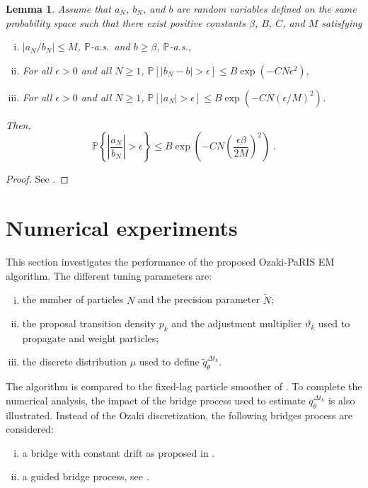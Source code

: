 \documentclass[12pt]{article}
\newcommand{\eqsp}{\;}
\newcommand{\1}{\mathrm{1}}
\newtheorem{lemma}{Lemma}
\begin{document}
\begin{lemma}\label{lem:hoeffding:ratio}
Assume that $a_N$, $b_N$, and $b$ are random variables defined on the same probability space such that there exist positive constants $\beta$, $B$, $C$, and $M$ satisfying
\begin{enumerate}[(i)]
    \item $|a_N/b_N|\leq M$, $\mathbb{P}$-a.s.\ and  $b \geq \beta$, $\mathbb{P}$-a.s.,
    \item For all $\epsilon>0$ and all $N\geq1$, $\mathbb{P}\left[|b_N-b|>\epsilon \right]\leq B \exp\left(-C N \epsilon^2\right)$,
    \item For all $\epsilon>0$ and all $N\geq1$, $\mathbb{P} \left[ |a_N|>\epsilon \right]\leq B \exp\left(-C N \left(\epsilon/M\right)^2\right)$.
\end{enumerate}
Then,
$$
    \mathbb{P}\left\{ \left| \frac{a_N}{b_N} \right| > \epsilon \right\} \leq B \exp{\left(-C N \left(\frac{\epsilon \beta}{2M} \right)^2 \right)} \eqsp.
$$
\end{lemma}
\begin{proof}
See \cite{douc:garivier:moulines:olsson:2011}.
\end{proof}

\section{Numerical experiments}
\label{sec:exp}
This section investigates the performance of the proposed Ozaki-PaRIS EM algorithm. The different tuning parameters are:
\begin{enumerate}[i)]
\item the number of particles $N$ and the precision parameter $\widetilde{N}$;
\item the proposal transition density $p_k$ and the adjustment multiplier $\vartheta_k$ used to propagate and weight particles;
\item the discrete distribution $\mu$ used to define $\widetilde{q}_{\theta}^{\Delta t_k}$.
\end{enumerate}
The algorithm is compared to the fixed-lag particle smoother of \cite{}. To complete the numerical analysis, the impact of the bridge process used to estimate $q_{\theta}^{\Delta t_k}$ is also illustrated. Instead of the Ozaki discretization, the following bridges process are considered:
\begin{enumerate}[i)]
\item a bridge with constant drift as proposed in \cite{}.
\item a guided bridge process, see \cite{}.
\end{enumerate}
\end{document}
